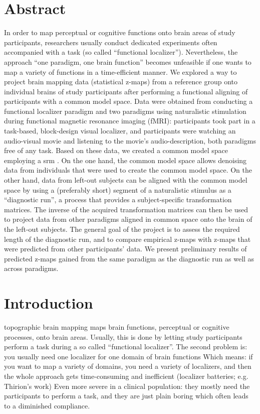 \section{Abstract}
%
In order to map perceptual or cognitive functions onto brain areas of study
participants, researchers usually conduct dedicated experiments often
accompanied with a task (so called ``functional localizer'').
%
Nevertheless, the approach ``one paradigm, one brain function'' becomes
unfeasible if one wants to map a variety of functions in a time-efficient
manner.
%
We explored a way to project brain mapping data (statistical z-maps) from a
reference group onto individual brains of study participants after performing a
functional aligning of participants with a common model space.
%
Data were obtained from conducting a functional localizer paradigm and two
paradigms using naturalistic stimulation during functional magnetic resonance
imaging (fMRI):
%
participants took part in a task-based, block-design visual localizer, and
participants were watching an audio-visual movie and listening to the movie's
audio-description, both paradigms free of any task.
%
Based on these data, we created a common model space employing a \ac{srm}
\citep{chen2015reduced}.
%
On the one hand, the common model space allows denoising data from individuals
that were used to create the common model space.
%
On the other hand, data from left-out subjects can be aligned with the common
model space by using a (preferably short) segment of a naturalistic stimulus as
a ``diagnostic run'', a process that provides a subject-specific transformation
matrices.
%
The inverse of the acquired transformation matrices can then be used to project
data from other paradigms aligned in common space onto the brain of the left-out
subjects.
%
The general goal of the project is to assess the required length of the
diagnostic run, and to compare empirical z-maps with z-maps that were predicted
from other participants' data.
%
We present preliminary results of predicted z-maps gained from the same paradigm
as the diagnostic run as well as across paradigms.


\section{Introduction}



topographic brain mapping maps brain functions, perceptual or cognitive
processes, onto brain areas.
Usually, this is done by letting study participants perform a task during a so
called ``functional localizer''.
The second problem is: you usually need one localizer for one domain of brain
functions
Which means: if you want to map a variety of domains, you need a variety of
localizers, and then the whole approach gets time-consuming and inefficient
(localizer batteries; e.g. Thirion's work)
Even more severe in a clinical population: they mostly need the participants to
perform a task, and they are just plain boring which often leads to a diminished
compliance.



